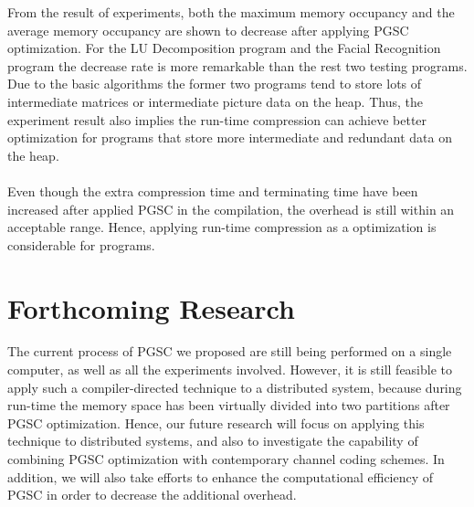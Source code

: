 \documentclass[a0,portrait]{a0poster}
\begin{document}
\begin{multicols}{2}
\vspace{1cm}

From the result of experiments, both the maximum memory occupancy and the average memory occupancy are shown to decrease after applying PGSC optimization. For the LU Decomposition program and the Facial Recognition program the decrease rate is more remarkable than the rest two testing programs. Due to the basic algorithms the former two programs tend to store lots of intermediate matrices or intermediate picture data on the heap. Thus, the experiment result also implies the run-time compression can achieve better optimization for programs that store more intermediate and redundant data on the heap. 
\\\\
Even though the extra compression time and terminating time have been increased after applied PGSC in the compilation, the overhead is still within an acceptable range. Hence, applying run-time compression as a optimization is considerable for programs.


\section*{Forthcoming Research}
The current process of PGSC we proposed are still being performed on a single computer, as well as all the experiments involved. However, it is still feasible to apply such a compiler-directed technique to a distributed system, because during run-time the memory space has been virtually divided into two partitions after PGSC optimization. Hence, our future research will focus on applying this technique to distributed systems, and also to investigate the capability of combining PGSC optimization with contemporary channel coding schemes. In addition, we will also take efforts to enhance the computational efficiency of PGSC in order to decrease the additional overhead. 


\nocite{*} %


\end{multicols}
\end{document}
